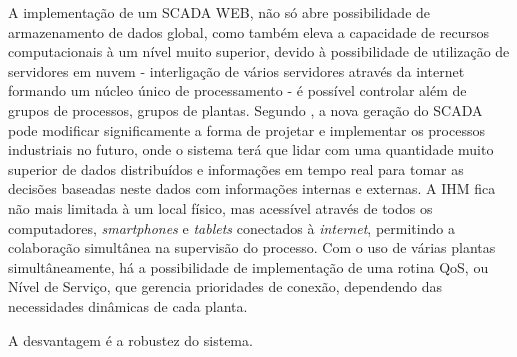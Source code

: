     \begin{figure}[!h]
    \end{figure}
    
    A implementação de um \gls{SCADA} \gls{WEB}, não só abre possibilidade de armazenamento de dados global, como também eleva a capacidade de recursos computacionais à um nível muito superior, devido à possibilidade de utilização de servidores em nuvem - interligação de vários servidores através da internet formando um núcleo único de processamento - é possível controlar além de grupos de processos, grupos de plantas. Segundo \cite{ScadaNextGer}, a nova geração do \gls{SCADA} pode modificar significamente a forma de projetar e implementar os processos industriais no futuro, onde o sistema terá que lidar com uma quantidade muito superior de dados distribuídos e informações em tempo real para tomar as decisões baseadas neste dados com informações internas e externas. A \gls{IHM} fica não mais limitada à um local físico, mas acessível através de todos os computadores, \textit{smartphones} e \textit{tablets} conectados à \textit{internet}, permitindo a colaboração simultânea na supervisão do processo. Com o uso de várias plantas simultâneamente, há a possibilidade de implementação de uma rotina \gls{QoS}, ou Nível de Serviço, que gerencia prioridades de conexão, dependendo das necessidades dinâmicas de cada planta.
    
    A desvantagem é a robustez do sistema.
    
